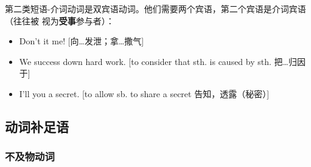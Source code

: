 第二类短语-介词动词是双宾语动词。他们需要两个宾语，第二个宾语是介词宾语（往往被
视为\textbf{受事}参与者）：
\begin{itemize}
\item Don't  it  me! [向…发泄；拿…撒气]

\item We  success down  hard work. [to consider that sth.
is caused by sth. 把…归因于]

\item I'll  you  a secret. [to allow sb. to share a secret
告知，透露（秘密）]
\end{itemize}

\subsection{动词补足语}

\subsubsection{不及物动词}

